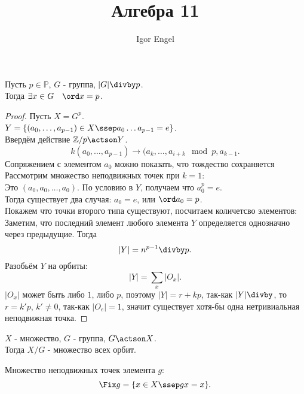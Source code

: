 \documentclass[11pt, oneside]{article}   	%
\title{Алгебра 11}
\author{Igor Engel}
\date{}
\begin{document}
\maketitle
\section{}
    \begin{theorem}
        Пусть $p\in \mathbb{P}$, $G$ - группа, $|G|\divby p$.\\
        Тогда $\exists{x\in G}\quad \ord x = p$.
        \begin{proof}
            Пусть $X = G^{p}$.\\
            $Y = \{(a_0, \ldots, a_{p-1})\in X \ssep a_0\ldots a_{p-1} = e\} $.\\
            Ввердём действие $\mathbb{Z}/p\actson Y$.\\
            \[ k(a_0, \ldots, a_{p-1}) \to (a_{k}, \ldots, a_{i+k}\mod p, a_{k-1} .\]
            Сопряжением с элементом $a_0$ можно показать, что тождество сохраняется\\ %
            Рассмотрим множество неподвижных точек при $k=1$:\\
            Это $(a_0, a_0, \ldots, a_0)$. По условию в $Y$, получаем что $a_0^{p}=e$.\\
            Тогда существует два случая: $a_0=e$, или $\ord a_0 = p$.\\
            Покажем что точки второго типа существуют, посчитаем количетсво элементов:\\
            Заметим, что последний элемент любого элемента $Y$ определяется однозначно через предыдущие. Тогда
            \[ |Y| = n^{p-1}\divby p .\]
            Разобьём $Y$ на орбиты:
            \[ |Y| = \sum\limits_{x} |O_x| .\]
            $|O_x|$ может быть либо $1$, либо $p$, поэтому $|Y| = r + kp$, так-как $|Y|\divby$, то $r=k'p$, $k' \neq  0$, так-как $|O_e| = 1$, значит существует хотя-бы одна нетривиальная неподвижная точка.
        \end{proof}
    \end{theorem}
    \begin{definition}
        $X$ - множество, $G$ - группа, $G\actson X$.\\
        Тогда $X / G$ - множество всех орбит.
    \end{definition}
    \begin{definition}
        Множество неподвижных точек элемента $g$:
        \[ \Fix g = \{x\in X\ssep gx=x\}  .\] 
    \end{definition}
\end{document}
